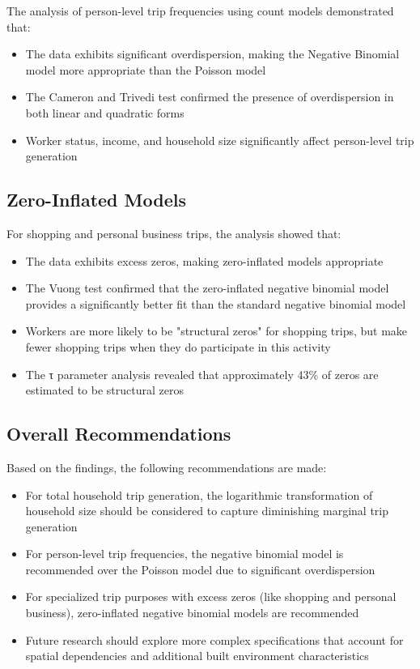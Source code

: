 \documentclass[12pt]{article}
\begin{document}
The analysis of person-level trip frequencies using count models demonstrated that:
\begin{itemize}
    \item The data exhibits significant overdispersion, making the Negative Binomial model more appropriate than the Poisson model
    \item The Cameron and Trivedi test confirmed the presence of overdispersion in both linear and quadratic forms
    \item Worker status, income, and household size significantly affect person-level trip generation
\end{itemize}

\subsection{Zero-Inflated Models}

For shopping and personal business trips, the analysis showed that:
\begin{itemize}
    \item The data exhibits excess zeros, making zero-inflated models appropriate
    \item The Vuong test confirmed that the zero-inflated negative binomial model provides a significantly better fit than the standard negative binomial model
    \item Workers are more likely to be "structural zeros" for shopping trips, but make fewer shopping trips when they do participate in this activity
    \item The τ parameter analysis revealed that approximately 43\% of zeros are estimated to be structural zeros
\end{itemize}

\subsection{Overall Recommendations}

Based on the findings, the following recommendations are made:
\begin{itemize}
    \item For total household trip generation, the logarithmic transformation of household size should be considered to capture diminishing marginal trip generation
    \item For person-level trip frequencies, the negative binomial model is recommended over the Poisson model due to significant overdispersion
    \item For specialized trip purposes with excess zeros (like shopping and personal business), zero-inflated negative binomial models are recommended
    \item Future research should explore more complex specifications that account for spatial dependencies and additional built environment characteristics
\end{itemize}
\end{document}
